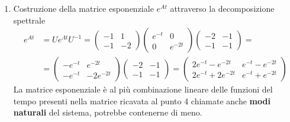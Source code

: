 \begin{enumerate}
\item Costruzione della matrice esponenziale $e^{At}$ attraverso la
decomposizione spettrale
$$\begin{aligned}
e^{At} &= Ue^{\Lambda t} U^{-1} = \begin{pmatrix}
                                    -1 & 1 \\
                                    -1 & -2
                                    \end{pmatrix} \begin{pmatrix}
                                                e^{-t} & 0 \\
                                                0 & e^{-2t}
                                                \end{pmatrix} \begin{pmatrix}
                                                -2 & -1 \\
                                                -1 & -1
                                                \end{pmatrix} = \\
    &= \begin{pmatrix}
        -e^{-t} & e^{-2t} \\
        -e^{-t} & -2e^{-2t}
        \end{pmatrix}\begin{pmatrix}
                    -2 & -1 \\
                    -1 & -1
                    \end{pmatrix} = \begin{pmatrix}
                                    2e^{-t}-e^{-2t} & e^{-t}-e^{-2t}\\
                                    2e^{-t}+2e^{-2t} & e^{-t}+e^{-2t}
                                    \end{pmatrix}
\end{aligned}$$
La matrice esponenziale è al più combinazione lineare delle funzioni del tempo
presenti nella matrice ricavata al punto 4 chiamate anche \textbf{modi
naturali} del sistema, potrebbe contenerne di meno.
\end{enumerate}

